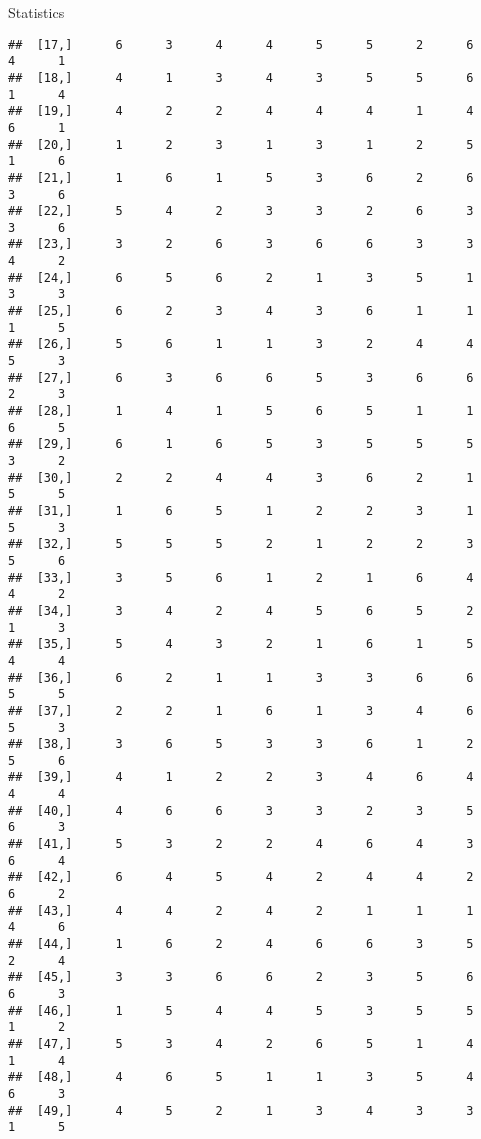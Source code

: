 \documentclass[
  ignorenonframetext,
]{beamer}
\begin{document}
\begin{frame}[fragile]{Statistics}
\begin{verbatim}
##  [17,]      6      3      4      4      5      5      2      6      4      1
##  [18,]      4      1      3      4      3      5      5      6      1      4
##  [19,]      4      2      2      4      4      4      1      4      6      1
##  [20,]      1      2      3      1      3      1      2      5      1      6
##  [21,]      1      6      1      5      3      6      2      6      3      6
##  [22,]      5      4      2      3      3      2      6      3      3      6
##  [23,]      3      2      6      3      6      6      3      3      4      2
##  [24,]      6      5      6      2      1      3      5      1      3      3
##  [25,]      6      2      3      4      3      6      1      1      1      5
##  [26,]      5      6      1      1      3      2      4      4      5      3
##  [27,]      6      3      6      6      5      3      6      6      2      3
##  [28,]      1      4      1      5      6      5      1      1      6      5
##  [29,]      6      1      6      5      3      5      5      5      3      2
##  [30,]      2      2      4      4      3      6      2      1      5      5
##  [31,]      1      6      5      1      2      2      3      1      5      3
##  [32,]      5      5      5      2      1      2      2      3      5      6
##  [33,]      3      5      6      1      2      1      6      4      4      2
##  [34,]      3      4      2      4      5      6      5      2      1      3
##  [35,]      5      4      3      2      1      6      1      5      4      4
##  [36,]      6      2      1      1      3      3      6      6      5      5
##  [37,]      2      2      1      6      1      3      4      6      5      3
##  [38,]      3      6      5      3      3      6      1      2      5      6
##  [39,]      4      1      2      2      3      4      6      4      4      4
##  [40,]      4      6      6      3      3      2      3      5      6      3
##  [41,]      5      3      2      2      4      6      4      3      6      4
##  [42,]      6      4      5      4      2      4      4      2      6      2
##  [43,]      4      4      2      4      2      1      1      1      4      6
##  [44,]      1      6      2      4      6      6      3      5      2      4
##  [45,]      3      3      6      6      2      3      5      6      6      3
##  [46,]      1      5      4      4      5      3      5      5      1      2
##  [47,]      5      3      4      2      6      5      1      4      1      4
##  [48,]      4      6      5      1      1      3      5      4      6      3
##  [49,]      4      5      2      1      3      4      3      3      1      5

\end{verbatim}
\end{frame}
\end{document}
